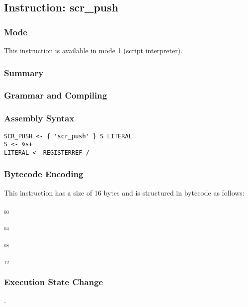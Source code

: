\subsection{Instruction: scr\_push}

\subsubsection{Mode}
This instruction is available in mode 1 (script interpreter).
\subsubsection{Summary}


\subsubsection{Grammar and Compiling}


\subsubsection{Assembly Syntax}

\begin{myquote}
\begin{verbatim}
SCR_PUSH <- { 'scr_push' } S LITERAL
S <- %s+
LITERAL <- REGISTERREF /
\end{verbatim}
\end{myquote}

\subsubsection{Bytecode Encoding}

This instruction has a size of 16 bytes and is structured in bytecode as follows:

$_{00}$\ 



$_{04}$\ 



$_{08}$\ 



$_{12}$\ 
\fbox{%
  \parbox{20pt}{%
00
  }%
}

\subsubsection{Execution State Change}

.


